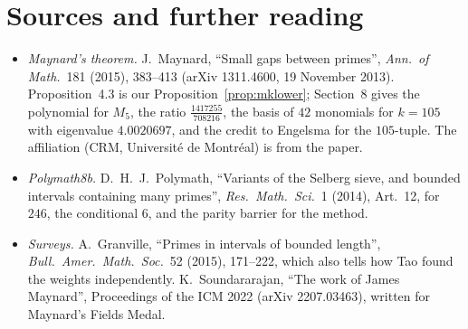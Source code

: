 \section*{Sources and further reading}

\begin{itemize}
\item \emph{Maynard's theorem.} J.~Maynard, ``Small gaps between primes'', \emph{Ann.\ of Math.}\ 181 (2015), 383--413 (arXiv 1311.4600, 19 November 2013). Proposition~4.3 is our Proposition~\ref{prop:mklower}; Section~8 gives the polynomial for $M_5$, the ratio $\frac{1417255}{708216}$, the basis of $42$ monomials for $k=105$ with eigenvalue $4.0020697$, and the credit to Engelsma for the $105$-tuple. The affiliation (CRM, Université de Montréal) is from the paper.
\item \emph{Polymath8b.} D.~H.~J.~Polymath, ``Variants of the Selberg sieve, and bounded intervals containing many primes'', \emph{Res.\ Math.\ Sci.}\ 1 (2014), Art.~12, for $246$, the conditional $6$, and the parity barrier for the method.
\item \emph{Surveys.} A.~Granville, ``Primes in intervals of bounded length'', \emph{Bull.\ Amer.\ Math.\ Soc.}\ 52 (2015), 171--222, which also tells how Tao found the weights independently. K.~Soundararajan, ``The work of James Maynard'', Proceedings of the ICM 2022 (arXiv 2207.03463), written for Maynard's Fields Medal.
\end{itemize}
